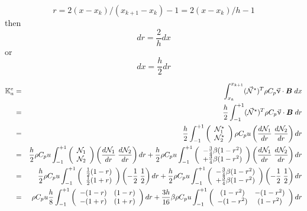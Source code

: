 \[
r = 2(x-x_k)/(x_{k+1}-x_{k}) -1 =2(x-x_k)/h  -1
\]
then 
\[
dr = \frac{2}{h} dx
\]
or
\[
dx=\frac{h}{2} dr
\]


\begin{eqnarray}
{\K}_a^e 
&=& \int_{x_k}^{x_{k+1}}   ({\vec \bN}^\star)^T \rho C_p \vec\upnu \cdot {\bm B} \; dx  \nn\\
&=& \frac{h}{2} \int_{-1}^{+1}   ({\vec \bN}^\star)^T \rho C_p \vec\upnu \cdot {\bm B} \; dr  \nn\\
&=& \frac{h}{2} \int_{-1}^{+1} 
\left(\begin{array}{c}
{\bN}_1^\star \\ {\bN}_2^\star 
\end{array}\right)
\rho C_p u \left( \frac{d\bN_1}{dr} \; \frac{d\bN_2}{dr} \right)  dr \nn\\
&=& 
\frac{h}{2} \rho C_p u \int_{-1}^{+1} 
\left(\begin{array}{c}
{\bN}_1 \\ {\bN}_2
\end{array}\right)
\left( \frac{d\bN_1}{dr} \; \frac{d\bN_2}{dr} \right)  dr
+
\frac{h}{2} \rho C_p u \int_{-1}^{+1} 
\left(\begin{array}{c}
-\frac{3}{4}\beta(1-r^2) \\ +\frac{3}{4}\beta(1-r^2) 
\end{array}\right)
\left( \frac{d\bN_1}{dr} \; \frac{d\bN_2}{dr} \right)  dr 
\nn\\
&=& 
\frac{h}{2} \rho C_p u \int_{-1}^{+1} 
\left(\begin{array}{c}
\frac12 (1-r) \\ \frac12(1+r)
\end{array}\right)
\left( -\frac12 \; \frac12 \right)  dr
+
\frac{h}{2} \rho C_p u \int_{-1}^{+1} 
\left(\begin{array}{c}
-\frac{3}{4}\beta(1-r^2) \\ +\frac{3}{4}\beta(1-r^2) 
\end{array}\right)
\left( -\frac12 \; \frac12 \right)  dr  
\nn\\
&=& \rho C_p u \frac{h}{8}\int_{-1}^{+1} 
\left(\begin{array}{cc}
-(1-r) & (1-r)  \\
-(1+r) & (1+r)
\end{array}\right)  dr
+
\frac{3h}{16}\beta
\rho C_p u \int_{-1}^{+1} 
\left(\begin{array}{cc}
(1-r^2) & -(1-r^2) \\
-(1-r^2) & (1-r^2) 
\end{array}\right)  dr

\end{eqnarray}
